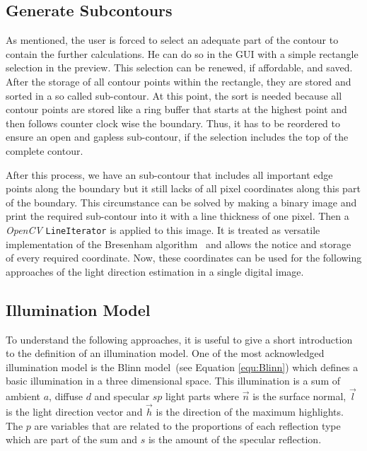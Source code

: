 \subsection{Generate Subcontours}\label{sec:subcontours}

As mentioned, the user is forced to select an adequate part of the contour to contain the further calculations. He can do so in the GUI with a simple rectangle selection in the preview. This selection can be renewed, if affordable, and saved. After the storage of all contour points within the rectangle, they are stored and sorted in a so called  sub-contour. At this point, the sort is needed because all contour points are stored like a ring buffer that starts at the highest point and then follows counter clock wise the boundary. Thus, it has to be reordered to ensure an open and gapless sub-contour, if the selection includes the top of the complete contour.

After this process, we have an sub-contour that includes all important edge points along the boundary but it still lacks of all pixel coordinates along this part of the boundary.
This circumstance can be solved by making a binary image and print the required sub-contour into it with a line thickness of one pixel. Then a \textit{OpenCV} \texttt{LineIterator} is applied to this image. It is treated as versatile implementation of the Bresenham algorithm~\cite{5388473} and allows the notice and storage of every required coordinate. Now, these coordinates can be used for the following approaches of the light direction estimation in a single digital image.


\subsection{Illumination Model}\label{sec:lightingmodel}
To understand the following approaches, it is useful to give a short introduction to the definition of an illumination model. One of the most acknowledged illumination model is the Blinn model~\cite{Blinn:1977}(see Equation \ref{equ:Blinn}) which defines a basic illumination in a three dimensional space. This illumination is a sum of ambient $a$, diffuse $d$ and specular $sp$ light parts where $\vec{n}$ is the surface normal, $\vec{l}$ is the light direction vector and $\vec{h}$ is the direction of the maximum highlights. The $p$ are variables that are related to the proportions of each reflection type which are part of the sum and $s$ is the amount of the specular reflection.

